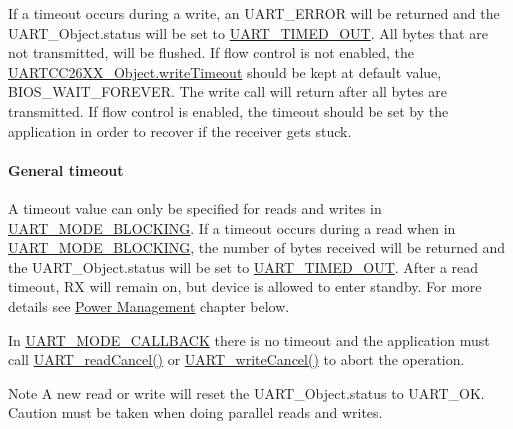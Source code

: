 If a timeout occurs during a write, an U\+A\+R\+T\+\_\+\+E\+R\+R\+O\+R will be returned and the U\+A\+R\+T\+\_\+\+Object.\+status will be set to \hyperlink{_u_a_r_t_c_c26_x_x_8h_a778bbef5f4b52a5651552136715f53c4aa965b1df388dcc5c87f1bb51120877c7}{U\+A\+R\+T\+\_\+\+T\+I\+M\+E\+D\+\_\+\+O\+U\+T}. All bytes that are not transmitted, will be flushed. If flow control is not enabled, the \hyperlink{struct_u_a_r_t_c_c26_x_x___object_a55b3ddd718d4de0aeffd2426c3f14efd}{U\+A\+R\+T\+C\+C26\+X\+X\+\_\+\+Object.\+write\+Timeout} should be kept at default value, B\+I\+O\+S\+\_\+\+W\+A\+I\+T\+\_\+\+F\+O\+R\+E\+V\+E\+R. The write call will return after all bytes are transmitted. If flow control is enabled, the timeout should be set by the application in order to recover if the receiver gets stuck.

\paragraph*{General timeout}

A timeout value can only be specified for reads and writes in \hyperlink{_u_a_r_t_8h_a2507a620dba95cd20885c52494d19e90ae6b6bd5d2d5df859ad6724e89e605ebf}{U\+A\+R\+T\+\_\+\+M\+O\+D\+E\+\_\+\+B\+L\+O\+C\+K\+I\+N\+G}. If a timeout occurs during a read when in \hyperlink{_u_a_r_t_8h_a2507a620dba95cd20885c52494d19e90ae6b6bd5d2d5df859ad6724e89e605ebf}{U\+A\+R\+T\+\_\+\+M\+O\+D\+E\+\_\+\+B\+L\+O\+C\+K\+I\+N\+G}, the number of bytes received will be returned and the U\+A\+R\+T\+\_\+\+Object.\+status will be set to \hyperlink{_u_a_r_t_c_c26_x_x_8h_a778bbef5f4b52a5651552136715f53c4aa965b1df388dcc5c87f1bb51120877c7}{U\+A\+R\+T\+\_\+\+T\+I\+M\+E\+D\+\_\+\+O\+U\+T}. After a read timeout, R\+X will remain on, but device is allowed to enter standby. For more details see \hyperlink{_u_a_r_t_c_c26_x_x_8h_POWER_MANAGEMENT}{Power Management} chapter below.

In \hyperlink{_u_a_r_t_8h_a2507a620dba95cd20885c52494d19e90ae0dbd9b5195e56c3c2aed10163523754}{U\+A\+R\+T\+\_\+\+M\+O\+D\+E\+\_\+\+C\+A\+L\+L\+B\+A\+C\+K} there is no timeout and the application must call \hyperlink{_u_a_r_t_8h_a51ed7e94d5b409ca1fcb2d65c5a25c3c}{U\+A\+R\+T\+\_\+read\+Cancel()} or \hyperlink{_u_a_r_t_8h_a0482cd0ab9ee7e802c8e785a5754d16d}{U\+A\+R\+T\+\_\+write\+Cancel()} to abort the operation.

\begin{DoxyNote}{Note}
A new read or write will reset the U\+A\+R\+T\+\_\+\+Object.\+status to U\+A\+R\+T\+\_\+\+O\+K. Caution must be taken when doing parallel reads and writes.
\end{DoxyNote}
